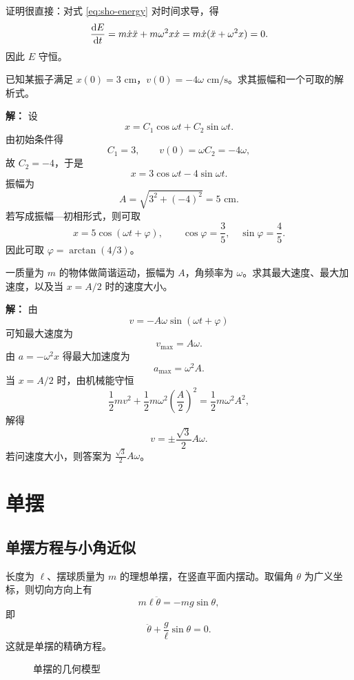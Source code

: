 证明很直接：对式 \eqref{eq:sho-energy} 对时间求导，得
\[
\dv{E}{t}=m\dot x\ddot x+m\omega^2x\dot x
= m\dot x(\ddot x+\omega^2x)=0.
\]
因此 $E$ 守恒。

\begin{example}
已知某振子满足 $x(0)=3\text{ cm}$，$v(0)=-4\omega\text{ cm/s}$。求其振幅和一个可取的解析式。

\textbf{解：} 设
\[
x=C_1\cos\omega t+C_2\sin\omega t.
\]
由初始条件得
\[
C_1=3,
\qquad
v(0)=\omega C_2=-4\omega,
\]
故 $C_2=-4$，于是
\[
x=3\cos\omega t-4\sin\omega t.
\]
振幅为
\[
A=\sqrt{3^2+(-4)^2}=5\text{ cm}.
\]
若写成振幅—初相形式，则可取
\[
x=5\cos(\omega t+\varphi),
\qquad
\cos\varphi=\frac35,
\quad
\sin\varphi=\frac45.
\]
因此可取 $\varphi=\arctan(4/3)$。
\end{example}

\begin{example}
一质量为 $m$ 的物体做简谐运动，振幅为 $A$，角频率为 $\omega$。求其最大速度、最大加速度，以及当 $x=A/2$ 时的速度大小。

\textbf{解：} 由
\[
v=-A\omega\sin(\omega t+\varphi)
\]
可知最大速度为
\[
v_{\max}=A\omega.
\]
由 $a=-\omega^2x$ 得最大加速度为
\[
a_{\max}=\omega^2A.
\]
当 $x=A/2$ 时，由机械能守恒
\[
\frac12 m v^2+\frac12 m\omega^2\left(\frac{A}{2}\right)^2
=\frac12 m\omega^2A^2,
\]
解得
\[
v=\pm \frac{\sqrt3}{2}A\omega.
\]
若问速度大小，则答案为 $\frac{\sqrt3}{2}A\omega$。
\end{example}

\section{单摆}

\subsection{单摆方程与小角近似}

长度为 $\ell$、摆球质量为 $m$ 的理想单摆，在竖直平面内摆动。取偏角 $\theta$ 为广义坐标，则切向方向上有
\[
m\ell\ddot\theta=-mg\sin\theta,
\]
即
\begin{equation}
\ddot\theta+\frac{g}{\ell}\sin\theta=0.
\label{eq:pendulum-exact}
\end{equation}
这就是单摆的精确方程。

\begin{figure}[H]
\centering
{}
\caption{单摆的几何模型}
\end{figure}

